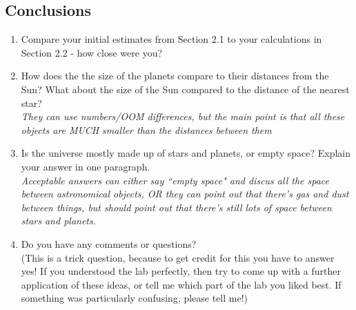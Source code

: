 \documentclass[12pt]{article}%
\begin{document}
\begin{flushleft}
\section{Conclusions}
\begin{enumerate}
\item Compare your initial estimates from Section 2.1 to your calculations in Section 2.2 - how close were you? 
\item How does the the size of the planets compare to their distances from the Sun?  What about the size of the Sun compared to the distance of the nearest star? \\ 
{\it They can use numbers/OOM differences, but the main point is that all these objects are MUCH smaller than the distances between them}
\item Is the universe mostly made up of stars and planets, or empty space? Explain your answer in one paragraph. \\  {\it Acceptable answers can either say ``empty space" and discus all the space between astronomical objects, OR they can point out that there's gas and dust between things, but should point out that there's still lots of space between stars and planets. }
\item Do you have any comments or questions? \\ (This is a trick question, because to get credit for this you have to answer yes! If you understood the lab perfectly, then try to come up with a further application of these ideas, or tell me which part of the lab you liked best. If something was particularly confusing, please tell me!)
\end{enumerate}


\end{flushleft}
\end{document}
